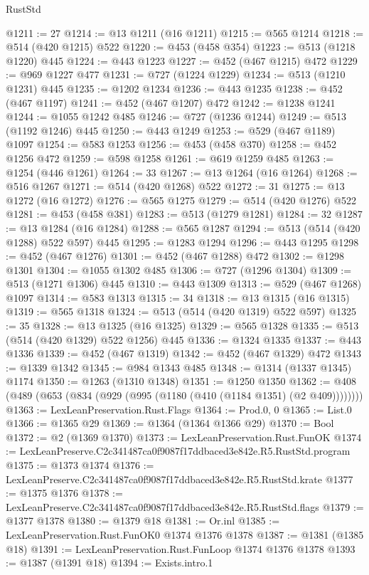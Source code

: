 \begin{lexlean}{RustStd}
\begin{coremodule}
@1211 := 27
@1214 := @13 @1211 (@16 @1211)
@1215 := @565 @1214
@1218 := @514 (@420 @1215) @522
@1220 := @453 (@458 @354)
@1223 := @513 (@1218 @1220) @445
@1224 := @443 @1223
@1227 := @452 (@467 @1215) @472
@1229 := @969 @1227 @477
@1231 := @727 (@1224 @1229)
@1234 := @513 (@1210 @1231) @445
@1235 := @1202 @1234
@1236 := @443 @1235
@1238 := @452 (@467 @1197)
@1241 := @452 (@467 @1207) @472
@1242 := @1238 @1241
@1244 := @1055 @1242 @485
@1246 := @727 (@1236 @1244)
@1249 := @513 (@1192 @1246) @445
@1250 := @443 @1249
@1253 := @529 (@467 @1189) @1097
@1254 := @583 @1253
@1256 := @453 (@458 @370)
@1258 := @452 @1256 @472
@1259 := @598 @1258
@1261 := @619 @1259 @485
@1263 := @1254 (@446 @1261)
@1264 := 33
@1267 := @13 @1264 (@16 @1264)
@1268 := @516 @1267
@1271 := @514 (@420 @1268) @522
@1272 := 31
@1275 := @13 @1272 (@16 @1272)
@1276 := @565 @1275
@1279 := @514 (@420 @1276) @522
@1281 := @453 (@458 @381)
@1283 := @513 (@1279 @1281)
@1284 := 32
@1287 := @13 @1284 (@16 @1284)
@1288 := @565 @1287
@1294 := @513 (@514 (@420 @1288) @522 @597) @445
@1295 := @1283 @1294
@1296 := @443 @1295
@1298 := @452 (@467 @1276)
@1301 := @452 (@467 @1288) @472
@1302 := @1298 @1301
@1304 := @1055 @1302 @485
@1306 := @727 (@1296 @1304)
@1309 := @513 (@1271 @1306) @445
@1310 := @443 @1309
@1313 := @529 (@467 @1268) @1097
@1314 := @583 @1313
@1315 := 34
@1318 := @13 @1315 (@16 @1315)
@1319 := @565 @1318
@1324 := @513 (@514 (@420 @1319) @522 @597)
@1325 := 35
@1328 := @13 @1325 (@16 @1325)
@1329 := @565 @1328
@1335 := @513 (@514 (@420 @1329) @522 @1256) @445
@1336 := @1324 @1335
@1337 := @443 @1336
@1339 := @452 (@467 @1319)
@1342 := @452 (@467 @1329) @472
@1343 := @1339 @1342
@1345 := @984 @1343 @485
@1348 := @1314 (@1337 @1345) @1174
@1350 := @1263 (@1310 @1348)
@1351 := @1250 @1350
@1362 := @408 (@489 (@653 (@834 (@929 (@995 (@1180 (@410 (@1184 @1351) (@2 @409))))))))
@1363 := LexLeanPreservation.Rust.Flags
@1364 := Prod.{0, 0}
@1365 := List.{0}
@1366 := @1365 @29
@1369 := @1364 (@1364 @1366 @29)
@1370 := Bool
@1372 := @2 (@1369 @1370)
@1373 := LexLeanPreservation.Rust.FunOK
@1374 := LexLeanPreserve.C2c341487ca0f9087f17ddbaced3e842e.R5.RustStd.program
@1375 := @1373 @1374
@1376 := LexLeanPreserve.C2c341487ca0f9087f17ddbaced3e842e.R5.RustStd.krate
@1377 := @1375 @1376
@1378 := LexLeanPreserve.C2c341487ca0f9087f17ddbaced3e842e.R5.RustStd.flags
@1379 := @1377 @1378
@1380 := @1379 @18
@1381 := Or.inl
@1385 := LexLeanPreservation.Rust.FunOK0 @1374 @1376 @1378
@1387 := @1381 (@1385 @18)
@1391 := LexLeanPreservation.Rust.FunLoop @1374 @1376 @1378
@1393 := @1387 (@1391 @18)
@1394 := Exists.intro.{1}

\end{coremodule}
\end{lexlean}
